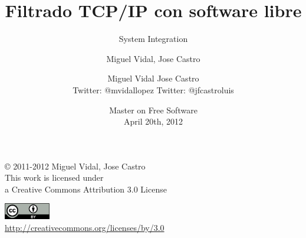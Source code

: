 \documentclass{beamer}
\begin{document}
\title{Filtrado TCP/IP con software libre}
\subtitle{System Integration}
\author{Miguel Vidal, Jose Castro} 
\date{\footnotesize{Master on Free Software \\ April 20th, 2012}}
\author{Miguel Vidal \hspace{1cm} Jose Castro \\
\hspace{0.5mm} {\tiny Twitter: @mvidallopez \hspace{1.1cm}Twitter: @jfcastroluis}
}



\begin{frame}
  \vspace{2cm}
  \begin{flushright}
    {\small \copyright{} 2011-2012 Miguel Vidal, Jose Castro} \\
    \medskip
    {\scriptsize This work is licensed under \\ a Creative Commons Attribution 3.0 License}
  \end{flushright}
  \begin{flushright}
    \href{http://creativecommons.org/licenses/by/3.0/es}{\includegraphics[width=2cm]{format/cc-by.png}} \\
    {\tiny \url{http://creativecommons.org/licenses/by/3.0}}
  \end{flushright}
\end{frame}%

\usebackgroundtemplate{}

\end{document}
